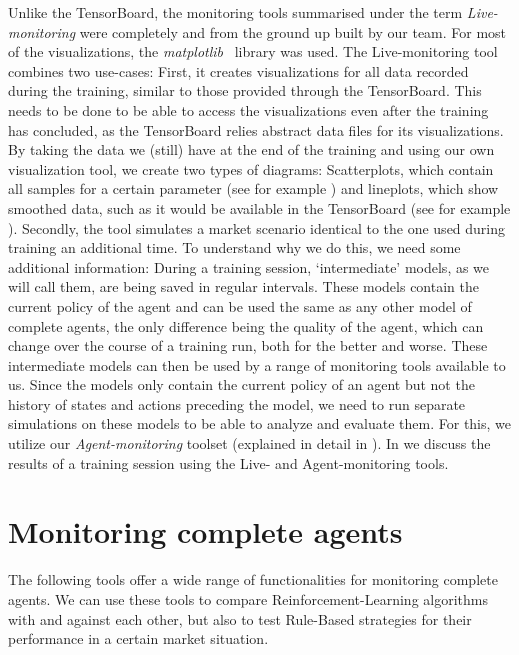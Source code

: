 Unlike the TensorBoard, the monitoring tools summarised under the term \emph{Live-monitoring} were completely and from the ground up built by our team. For most of the visualizations, the \emph{matplotlib}~\cite{Matplotlib} library was used. The Live-monitoring tool combines two use-cases: First, it creates visualizations for all data recorded during the training, similar to those provided through the TensorBoard. This needs to be done to be able to access the visualizations even after the training has concluded, as the TensorBoard relies abstract data files for its visualizations. By taking the data we (still) have at the end of the training and using our own visualization tool, we create two types of diagrams: Scatterplots, which contain all samples for a certain parameter (see for example ) and lineplots, which show smoothed data, such as it would be available in the TensorBoard (see for example ). Secondly, the tool simulates a market scenario identical to the one used during training an additional time. To understand why we do this, we need some additional information: During a training session, `intermediate' models, as we will call them, are being saved in regular intervals. These models contain the current policy of the agent and can be used the same as any other model of complete agents, the only difference being the quality of the agent, which can change over the course of a training run, both for the better and worse. These intermediate models can then be used by a range of monitoring tools available to us. Since the models only contain the current policy of an agent but not the history of states and actions preceding the model, we need to run separate simulations on these models to be able to analyze and evaluate them. For this, we utilize our \emph{Agent-monitoring} toolset (explained in detail in ). In  we discuss the results of a training session using the Live- and Agent-monitoring tools.

\section{Monitoring complete agents}\label{sec:CompleteAgents}

The following tools offer a wide range of functionalities for monitoring complete agents. We can use these tools to compare Reinforcement-Learning algorithms with and against each other, but also to test Rule-Based strategies for their performance in a certain market situation.

